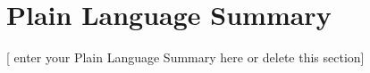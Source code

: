 \documentclass[draft]{agujournal2019}
\begin{document}


%
%

%
%
\newcommand{\mpryr}{~m~yr\textsuperscript{-1}}



\begin{abstract}
[ enter your Abstract here ]
\end{abstract}

\section*{Plain Language Summary}
[ enter your Plain Language Summary here or delete this section]


%
%
\end{document}
